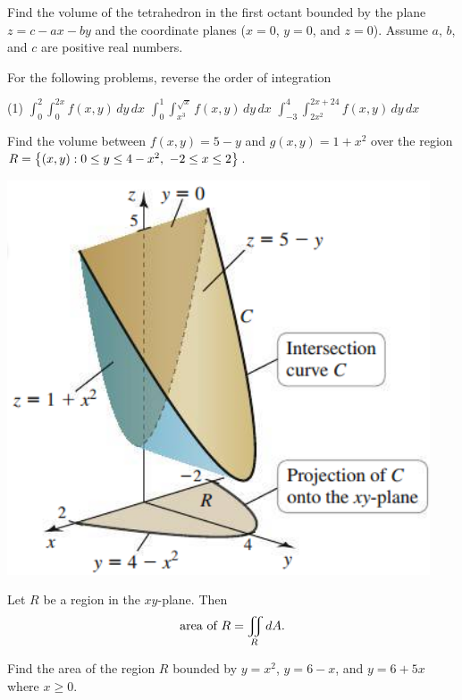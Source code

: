 \documentclass[mathNotesPreamble]{subfiles}
\begin{document}
  \begin{ex*}
    Find the volume of the tetrahedron in the first octant bounded by the plane $z=c-ax-by$ and the coordinate planes ($x=0$, $y=0$, and $z=0$). Assume $a$, $b$, and $c$ are positive real numbers.
  \end{ex*}
  \pagebreak

  \begin{ex*}
    For the following problems, reverse the order of integration
  \end{ex*}
  \begin{tasks}[after-item-skip=\stretch{1}, label=\textbullet](1)
    \task 
      $\displaystyle \int_{0}^{2} \int_{0}^{2x} f(x,y)\,dy\,dx$
    \task 
      $\displaystyle \int_{0}^{1} \int_{x^3}^{\sqrt{x}} f(x,y)\,dy\,dx$
    \task 
      $\displaystyle \int_{-3}^{4} \int_{2x^2}^{2x+24} f(x,y)\,dy\,dx$
  \end{tasks}
  \pagebreak

  \begin{ex*}
    Find the volume between $f(x,y)=5-y$ and $g(x,y)=1+x^2$ over the region $R={\left\{(x,y): 0\leq y\leq 4-x^2,\ -2\leq x\leq 2\right\}}$.
  \end{ex*}
  \begin{flushright}
    \includegraphics[width=0.3\linewidth]{images/briggs_16_02/fig16_23}
  \end{flushright}
  \pagebreak

  \begin{thmBox*}
    Let $R$ be a region in the $xy$-plane. Then
      \[\textnormal{area of } R=\iint\limits_R dA.\]
  \end{thmBox*}

  \begin{ex*}
    Find the area of the region $R$ bounded by $y=x^2$, $y=6-x$, and $y=6+5x$ where $x\geq 0$.
  \end{ex*}

  \pagebreak
  
\end{document}
